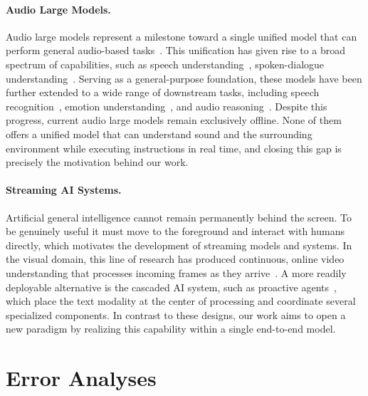\documentclass{article}
\begin{document}
\paragraph{Audio Large Models.}
Audio large models represent a milestone toward a single unified model
that can perform general audio-based
tasks~\citep{chu2024qwen2, qwen25omni2025, diffa2, stepaudio2}. This
unification has given rise to a broad spectrum of capabilities, such
as speech understanding~\citep{sakshi2024mmau}, spoken-dialogue
understanding~\citep{mmsu}. Serving
as a general-purpose foundation, these models have been further
extended to a wide range of downstream tasks, including speech
recognition~\citep{xu2025fireredasr, seed-asr, qwen3-asr, megaasr},
emotion understanding~\citep{emotionthinker}, and audio
reasoning~\citep{afcot, thinkwith,
audiocog, audio-reasoner}. Despite this progress, current audio
large models remain exclusively offline. None of them offers a unified
model that can understand sound and the surrounding environment while
executing instructions in real time, and closing this gap is precisely
the motivation behind our work.

\paragraph{Streaming AI Systems.}
Artificial general intelligence cannot remain permanently behind the
screen. To be genuinely useful it must move to the foreground and
interact with humans directly, which motivates the development of
streaming models and systems. In the visual domain, this line of
research has produced continuous, online video understanding that
processes incoming frames as they arrive~\citep{chen2024videollm,
li2025videochat}. A more readily deployable alternative is the cascaded AI
system, such as proactive agents~\citep{proactive, proagent,
pask,needllm}, which place the text modality at the center of processing and
coordinate several specialized components. In contrast to these
designs, our work aims to open a new paradigm by realizing this
capability within a single end-to-end model.



\newpage
\section{Error Analyses}
\label{app:analysis}
\end{document}
